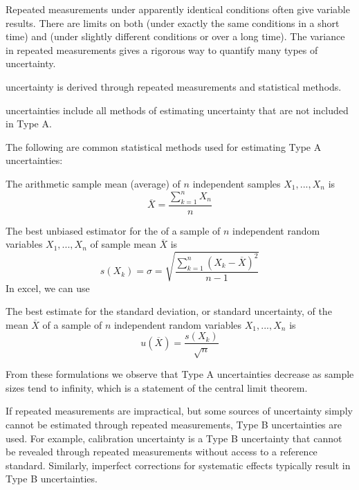 Repeated measurements under apparently identical conditions often give variable results. There are limits on both  (under exactly the same conditions in a short time) and  (under slightly different conditions or over a long time). The variance in repeated measurements gives a rigorous way to quantify many types of uncertainty.

\begin{defn}
     uncertainty is derived through repeated measurements and statistical methods.

     uncertainties include all methods of estimating uncertainty that are not included in Type A.
\end{defn}


The following are common statistical methods used for estimating Type A uncertainties:

\begin{defn}
    The arithmetic sample mean (average) of $n$ independent samples $X_1,...,X_n$ is $$\overline{X} =  \frac{\sum_{k=1}^nX_n}{n}$$
\end{defn}

\begin{defn}
    The best unbiased estimator for the  of a sample of $n$ independent random variables $X_1,...,X_n$ of sample mean $\overline{X}$ is $$s(X_k) = \sigma = \sqrt{\frac{\sum_{k=1}^n(X_k-\overline{X})^2}{n-1}}$$
    In excel, we can use 
\end{defn}

\begin{defn}
    The best estimate for the standard deviation, or standard uncertainty, of the mean $\overline{X}$ of a sample of $n$ independent random variables $X_1,...,X_n$ is $$u(\overline{X}) = \frac{s(X_k)}{\sqrt{n}}$$
\end{defn}

From these formulations we observe that Type A uncertainties decrease as sample sizes tend to infinity, which is a statement of the central limit theorem.

If repeated measurements are impractical, but some sources of uncertainty simply cannot be estimated through repeated measurements, Type B uncertainties are used. For example, calibration uncertainty is a Type B uncertainty that cannot be revealed through repeated measurements without access to a reference standard. Similarly, imperfect corrections for systematic effects typically result in Type B uncertainties.


